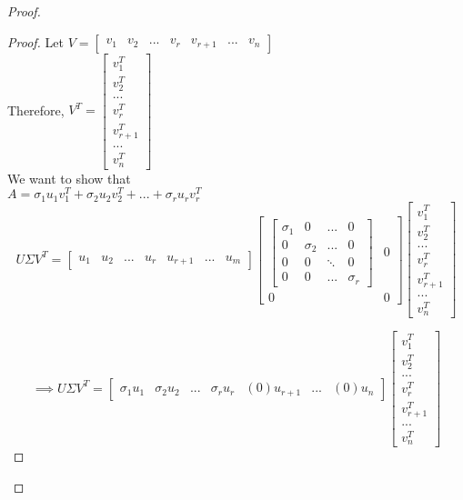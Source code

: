 \documentclass[12pt]{article}
\begin{document}
\begin{proof}
\begin{enumerate}[label=(\alph*)]
\begin{proof}
Let $V = \begin{bmatrix} v_1 & v_2 & ... & v_r & v_{r+1} & ... & v_n\end{bmatrix}$ \\

Therefore, $V^T = \begin{bmatrix} v_1^T \\ v_2^T \\ ... \\ v_r^T \\ v_{r+1}^T \\ ... \\ v_n^T\end{bmatrix} $ \\ 

We want to show that \\
$A = \sigma_{1}u_{1}v_{1}^T + \sigma_{2}u_{2}v_{2}^T + ... + \sigma_{r}u_{r}v_{r}^T$\\

$$ U\Sigma V^T = \begin{bmatrix} u_1 & u_2 & ... & u_r & u_{r+1} & ... & u_m\end{bmatrix} \begin{bmatrix}
    \begin{bmatrix}
        \sigma_1 & 0 & ... & 0 \\
        0 & \sigma_2 & ... & 0 \\
        0 & 0 & \ddots & 0 \\
        0 & 0 & ... & \sigma_r
    \end{bmatrix} & 0 \\
    0 & 0
\end{bmatrix} \begin{bmatrix} v_1^T \\ v_2^T \\ ... \\ v_r^T \\ v_{r+1}^T \\ ... \\ v_n^T\end{bmatrix}$$

$$\implies U\Sigma V^T = \begin{bmatrix} \sigma_{1}u_1 & \sigma_{2}u_2 & ... & \sigma_{r}u_r & (0)u_{r+1} & ... & (0)u_n\end{bmatrix} \begin{bmatrix} v_1^T \\ v_2^T \\ ... \\ v_r^T \\ v_{r+1}^T \\ ... \\ v_n^T\end{bmatrix} $$


\end{proof}
\end{enumerate}
\end{proof}
\end{document}
